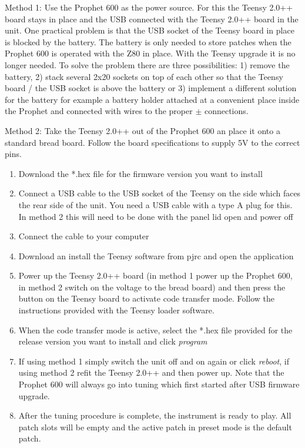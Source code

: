 Method 1: Use the Prophet 600 as the power source. For this the Teensy 2.0++ board stays in place and the USB connected with the Teensy 2.0++ board in the unit. One practical problem is that the USB socket of the Teensy board in place is blocked by the battery. The battery is only needed to store patches when the Prophet 600 is operated with the Z80 in place. With the Teensy upgrade it is no longer needed. To solve the problem there are three possibilities: 1) remove the battery, 2) stack several 2x20 sockets on top of each other so that the Teensy board / the USB socket is above the battery or 3) implement a different solution for the battery for example a battery holder attached at a convenient place inside the Prophet and connected with wires to the proper $\pm$ connections. 

Method 2: Take the Teensy 2.0++ out of the Prophet 600 an place it onto a standard bread board. Follow the board specifications to supply 5V to the correct pins.

\begin{enumerate}
  \item Download the *.hex file for the firmware version you want to install 
  \item Connect a USB cable to the USB socket of the Teensy on the side which faces the rear side of the unit. You need a USB cable with a type A plug for this. In method 2 this will need to be done with the panel lid open and power off 
  \item Connect the cable to your computer 
  \item Download an install the Teensy software from pjrc \cite{teensyloader} and open the application 
  \item Power up the Teensy 2.0++ board (in method 1 power up the Prophet 600, in method 2 switch on the voltage to the bread board) and then press the button on the Teensy board to activate code transfer mode. Follow the instructions provided with the Teensy loader software. 
  \item When the code transfer mode is active, select the *.hex file provided for the release version you want to install and click \textit{program}
  \item If using method 1 simply switch the unit off and on again or click \textit{reboot}, if using method 2 refit the Teensy 2.0++ and then power up. Note that the Prophet 600 will always go into tuning which first started after USB firmware upgrade.   
  \item After the tuning procedure is complete, the instrument is ready to play. All patch slots will be empty and the active patch in preset mode is the default patch. 
\end{enumerate}
